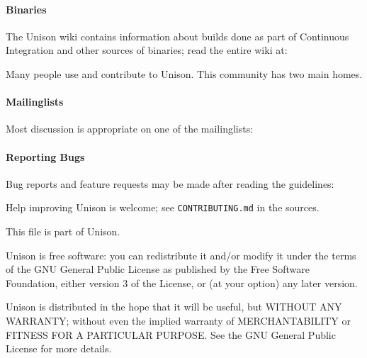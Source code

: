 \documentclass{article}
\begin{document}
\paragraph{Binaries}

The Unison wiki contains information about builds done as part of
Continuous Integration and other sources of binaries; read the entire
wiki at:
\begin{quote}
\end{quote}


Many people use and contribute to Unison.
This community has two main homes.

\paragraph{Mailinglists}

Most discussion is appropriate on one of the mailinglists:
\begin{quote}
\end{quote}

\paragraph{Reporting Bugs}

Bug reports and feature requests may be made after reading the guidelines:
\begin{quote}
\end{quote}

Help improving Unison is welcome; see {\tt CONTRIBUTING.md} in the sources.


This file is part of Unison.

    Unison is free software: you can redistribute it and/or modify
    it under the terms of the GNU General Public License as published by
    the Free Software Foundation, either version 3 of the License, or
    (at your option) any later version.

    Unison is distributed in the hope that it will be useful,
    but WITHOUT ANY WARRANTY; without even the implied warranty of
    MERCHANTABILITY or FITNESS FOR A PARTICULAR PURPOSE.  See the
    GNU General Public License for more details.
\end{document}
